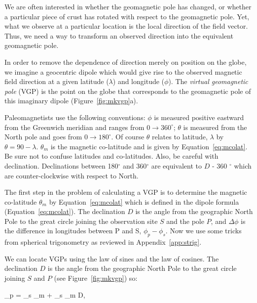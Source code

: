  We are often interested in
whether the geomagnetic pole has changed, or whether a particular piece of crust
has rotated with respect to the geomagnetic pole.  Yet, what we
observe at a particular location is the local direction of the field
vector.  Thus, we need a way to transform an observed direction into the
equivalent geomagnetic pole. 

In order to remove the dependence of direction merely on position 
on the globe,  we imagine a geocentric dipole which would
give rise to the observed magnetic field direction
 at a given latitude ($\lambda$) and
longitude ($\phi$).  
%
%
The {\it virtual geomagnetic pole} (VGP) is the point
on the globe that corresponds to the geomagnetic pole of this imaginary dipole 
(Figure~\ref{fig:mkvgp}a).

Paleomagnetists use the following conventions:   $\phi$  is measured
positive eastward from the Greenwich meridian and
ranges from $0 \rightarrow 360^\circ$;  $\theta $  is measured  from
the North pole and goes from $0 \rightarrow 180^\circ$. Of course
$\theta $ relates
to latitude, $\lambda $ by $\theta = 90 - \lambda $.  $\theta_m$ is the
magnetic co-latitude and is given by Equation~\ref{eq:mcolat}. 
Be sure not to confuse latitudes and co-latitudes.
Also, be careful with 
%
declination.  Declinations between 180$^\circ$
and 360$^{\circ}$ are equivalent to $D$ - 360 $^\circ$ which are
counter-clockwise with respect to North.  

The first step in the problem  of calculating a VGP is to determine the
%
 magnetic co-latitude $\theta_m$ by Equation~\ref{eq:mcolat} which is defined in the dipole formula (Equation~\ref{eq:mcolat}).
The declination $D$ is the angle from the geographic
North Pole to the
great circle joining the observation site $S$ and the pole $P$, and $\Delta \phi$ is the difference
in longitudes between P and S, 
$\phi_p-\phi_s$.  Now we use some tricks from 
%
spherical trigonometry as reviewed in Appendix~\ref{app:strig}.

 
We can  locate VGPs using the law of sines and the law of cosines. 
The 
declination $D$ is the angle from the geographic North Pole
to the
great circle joining $S$ and $P$ (see Figure~\ref{fig:mkvgp}) so:
 
\def\pih{{\pi \over 2}}
\beq \cos \theta_p = \cos \theta_s  \cos
\theta_m + \sin \theta_s \sin \theta_m \cos D, 
\label{eq:vgplat}
\eeq
 
